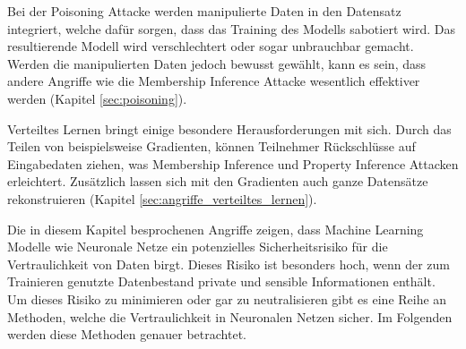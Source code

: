 Bei der Poisoning Attacke werden manipulierte Daten in den Datensatz integriert, welche dafür sorgen, dass das Training des Modells sabotiert wird.
Das resultierende Modell wird verschlechtert oder sogar unbrauchbar gemacht.
Werden die manipulierten Daten jedoch bewusst gewählt, kann es sein, dass andere Angriffe wie die Membership Inference Attacke wesentlich effektiver werden (Kapitel \ref{sec:poisoning}).

Verteiltes Lernen bringt einige besondere Herausforderungen mit sich.
Durch das Teilen von beispielsweise Gradienten, können Teilnehmer Rückschlüsse auf Eingabedaten ziehen, was Membership Inference und Property Inference Attacken erleichtert.
Zusätzlich lassen sich mit den Gradienten auch ganze Datensätze rekonstruieren (Kapitel \ref{sec:angriffe_verteiltes_lernen}).

Die in diesem Kapitel besprochenen Angriffe zeigen, dass Machine Learning Modelle wie Neuronale Netze ein potenzielles Sicherheitsrisiko für die Vertraulichkeit von Daten birgt.
Dieses Risiko ist besonders hoch, wenn der zum Trainieren genutzte Datenbestand private und sensible Informationen enthält.
Um dieses Risiko zu minimieren oder gar zu neutralisieren gibt es eine Reihe an Methoden, welche die Vertraulichkeit in Neuronalen Netzen sicher.
Im Folgenden werden diese Methoden genauer betrachtet.
